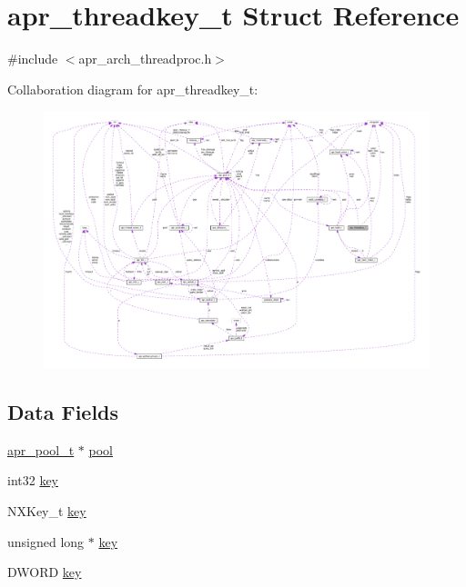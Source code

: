 \hypertarget{structapr__threadkey__t}{}\section{apr\+\_\+threadkey\+\_\+t Struct Reference}
\label{structapr__threadkey__t}


{\ttfamily \#include $<$apr\+\_\+arch\+\_\+threadproc.\+h$>$}



Collaboration diagram for apr\+\_\+threadkey\+\_\+t\+:
\nopagebreak
\begin{figure}[H]
\begin{center}
\leavevmode
\includegraphics[width=350pt]{structapr__threadkey__t__coll__graph}
\end{center}
\end{figure}
\subsection*{Data Fields}
\begin{DoxyCompactItemize}
\item 
\hyperlink{structapr__pool__t}{apr\+\_\+pool\+\_\+t} $\ast$ \hyperlink{structapr__threadkey__t_a400200f84ec2f8a160beaa933b6a8b2a}{pool}
\item 
int32 \hyperlink{structapr__threadkey__t_af64a505d11a973d13a331f9cd3033e8c}{key}
\item 
N\+X\+Key\+\_\+t \hyperlink{structapr__threadkey__t_af3099d0fc83e89daea2979a2760f43f3}{key}
\item 
unsigned long $\ast$ \hyperlink{structapr__threadkey__t_a40bc8a208b8ca674446884ecc4d89a23}{key}
\item 
D\+W\+O\+RD \hyperlink{structapr__threadkey__t_a4c015e5602825b30c3fc35950fdbf41b}{key}
\end{DoxyCompactItemize}


